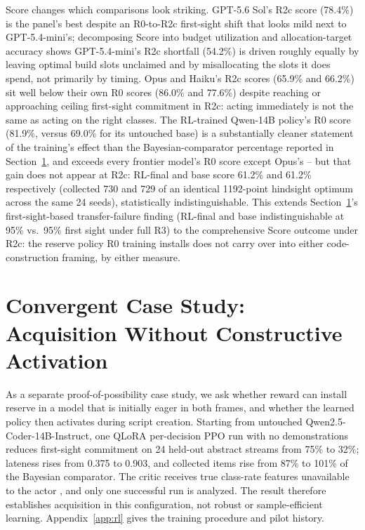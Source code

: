 \documentclass{article}
\begin{document}
Score changes which comparisons look striking. GPT-5.6 Sol's R2c score
(78.4\%) is the panel's best despite an R0-to-R2c first-sight shift that looks
mild next to GPT-5.4-mini's; decomposing Score into budget utilization and
allocation-target accuracy shows GPT-5.4-mini's R2c shortfall (54.2\%) is
driven roughly equally by leaving optimal build slots unclaimed and by
misallocating the slots it does spend, not primarily by timing. Opus and
Haiku's R2c scores (65.9\% and 66.2\%) sit well below their own R0 scores (86.0\%
and 77.6\%) despite reaching or approaching ceiling first-sight commitment in
R2c: acting immediately is not the same as acting on the right classes. The
RL-trained Qwen-14B policy's R0 score (81.9\%, versus 69.0\% for its untouched
base) is a substantially cleaner statement of the training's effect than the
Bayesian-comparator percentage reported in
Section~\ref{sec:qwen-case-study}, and exceeds every
frontier model's R0 score except Opus's -- but that gain does not appear at
R2c: RL-final and base score 61.2\% and 61.2\% respectively (collected 730
and 729 of an identical 1192-point hindsight optimum across the same 24
seeds), statistically indistinguishable. This extends
Section~\ref{sec:qwen-case-study}'s first-sight-based transfer-failure finding
(RL-final and base indistinguishable at 95\% vs.\ 95\% first sight under full
R3) to the comprehensive Score outcome under R2c: the reserve policy R0
training installs does not carry over into either code-construction framing,
by either measure.

\section{Convergent Case Study: Acquisition Without Constructive Activation}
\label{sec:qwen-case-study}

As a separate proof-of-possibility case study, we ask whether reward can install
reserve in a model that is initially eager in both frames, and whether the
learned policy then activates during script creation. Starting from untouched
Qwen2.5-Coder-14B-Instruct, one QLoRA \cite{dettmers2023qlora} per-decision PPO
\cite{schulman2017ppo} run with no demonstrations reduces first-sight
commitment on 24 held-out abstract streams from 75\% to 32\%; lateness rises
from 0.375 to 0.903, and collected items rise from 87\% to 101\% of the
Bayesian comparator. The critic receives true class-rate features unavailable
to the actor \cite{pinto2018asymmetric}, and only one successful run is
analyzed. The result therefore establishes acquisition in this configuration,
not robust or sample-efficient learning. Appendix~\ref{app:rl} gives the
training procedure and pilot history.
\end{document}
